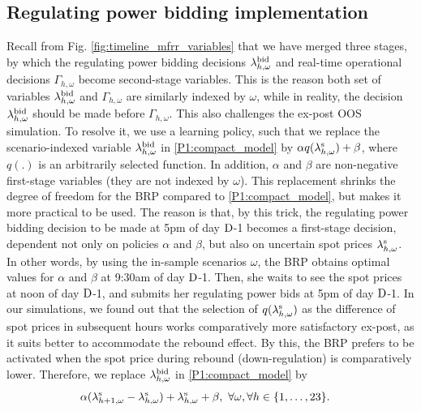 \documentclass[11pt,a4paper]{article}
\begin{document}
\subsection{Regulating power bidding implementation}\label{sec:mFRR_bidding_implementation}
Recall from  Fig. \ref{fig:timeline_mfrr_variables} that we have merged three stages, by which the regulating power bidding decisions $\lambda_{h,\omega}^{\rm{bid}}$ and real-time operational decisions $\Gamma_{h,\omega}$ become second-stage variables. This is the reason both set of variables $\lambda_{h,\omega}^{\rm{bid}}$ and $\Gamma_{h,\omega}$ are similarly indexed by $\omega$, while in reality, the decision $\lambda_{h,\omega}^{\rm{bid}}$ should be made before $\Gamma_{h,\omega}$. This also challenges the ex-post OOS simulation. To resolve it, we use a learning policy, such that we replace the scenario-indexed variable $\lambda_{h,\omega}^{\rm{bid}}$ in \eqref{P1:compact_model} by $\alpha q(\lambda_{h,\omega}^{\rm{s}}) + \beta$, where $q(.)$ is an arbitrarily selected function. In addition, $\alpha$ and $\beta$ are non-negative first-stage  variables (they are not indexed by $\omega$). This replacement shrinks the degree of freedom for the BRP compared to \eqref{P1:compact_model}, but makes it more practical to be used. The reason is that, by this trick, the regulating power bidding decision to be made at 5pm of day $\rm{D}$-1 becomes a first-stage decision, dependent not only on policies $\alpha$ and $\beta$, but also on uncertain spot prices $\lambda_{h,\omega}^{\rm{s}}$. In other words, by using the in-sample scenarios $\omega$, the BRP obtains optimal values for $\alpha$ and $\beta$ at 9:30am of day $\rm{D}$-1. Then, she waits to see the spot prices at noon of day $\rm{D}$-1, and  submits her regulating power bids at 5pm of day $\rm{D}$-1. In our simulations, we found out that the selection of $q(\lambda_{h,\omega}^{\rm{s}})$ as the difference of spot prices in subsequent hours works comparatively more satisfactory ex-post, as it suits better to accommodate the rebound effect. By this, the BRP prefers to be activated when the spot price during rebound (down-regulation) is comparatively lower. Therefore, we replace $\lambda_{h,\omega}^{\rm{bid}}$ in \eqref{P1:compact_model} by
%
\begin{align}\label{eq:affine_policy}
     & \alpha ( \lambda_{h+1,\omega}^{\rm{s}} - \lambda_{h,\omega}^{\rm{s}}) + \lambda_{h,\omega}^{\rm{s}} + \beta, \ \forall{\omega}, \forall{h} \in \{1, \ldots, 23\}.
\end{align}
\end{document}
